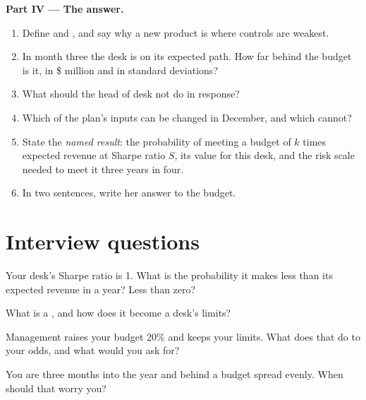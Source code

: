 \begin{problem}
\medskip\noindent\textbf{Part IV --- The answer.}
\begin{enumerate}[resume]
\item Define  and , and say why a new product is where controls are weakest.
\item In month three the desk is on its expected path. How far behind the budget is it, in \$ million and in standard deviations?
\item What should the head of desk not do in response?
\item Which of the plan's inputs can be changed in December, and which cannot?
\item State the \emph{named result}: the probability of meeting a budget of $k$ times expected revenue at Sharpe ratio $S$, its value for this
desk, and the risk scale needed to meet it three years in four.
\item In two sentences, write her answer to the budget.
\end{enumerate}
\end{problem}

\section{Interview questions}

\begin{interviewq}\label{iq:fm:the-head-of-desks-job:1}
Your desk's Sharpe ratio is 1. What is the probability it makes less than its expected revenue in a year? Less than zero?
\end{interviewq}

\begin{interviewq}\label{iq:fm:the-head-of-desks-job:2}
What is a , and how does it become a desk's limits?
\end{interviewq}

\begin{interviewq}\label{iq:fm:the-head-of-desks-job:3}
Management raises your budget 20\% and keeps your limits. What does that do to your odds, and what would you ask for?
\end{interviewq}

\begin{interviewq}\label{iq:fm:the-head-of-desks-job:4}
You are three months into the year and behind a budget spread evenly. When should that worry you?
\end{interviewq}

